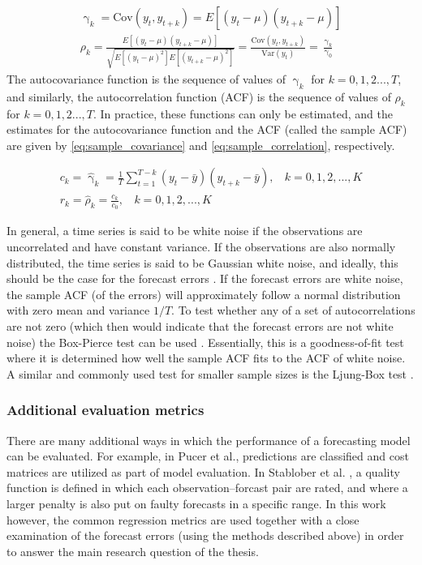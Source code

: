 \begin{gather}
     \upgamma_k = \text{Cov}(y_t, y_{t+k}) = E[(y_t - \mu)(y_{t+k} - \mu)] \label{eq:covariance} \\[1ex]
     \rho_k = \frac{E[(y_t - \mu)(y_{t+k} - \mu)]}{\sqrt{E[(y_t - \mu)^2]E[(y_{t+k} - \mu)^2]}} = \frac{\text{Cov}(y_t, y_{t+k})}{\text{Var}(y_t)} = \frac{\upgamma_k}{\upgamma_0}\label{eq:correlation}
\end{gather}
The autocovariance function is the sequence of values of $\upgamma_k$ for $k=0,1,2 ..., T$, and similarly, the autocorrelation function (ACF) is the sequence of values of $\rho_k$ for $k=0,1,2 ..., T$. In practice, these functions can only be estimated, and the estimates for the autocovariance function and the ACF (called the sample ACF) are given by \cref{eq:sample_covariance} and \cref{eq:sample_correlation}, respectively.

\begin{gather}
     c_k=\hat{\upgamma}_k = \frac{1}{T} \sum_{t=1}^{T-k} (y_t - \bar{y})(y_{t+k} - \bar{y}), \:\:\:\: k = 0,1,2,...,K \label{eq:sample_covariance} \\[1ex]
     r_k = \hat{\rho}_k = \frac{c_k}{c_0}, \:\:\:\: k = 0,1,2,...,K \label{eq:sample_correlation}
\end{gather}

In general, a time series is said to be white noise if the observations are uncorrelated and have constant variance. If the observations are also normally distributed, the time series is said to be Gaussian white noise, and ideally, this should be the case for the forecast errors \cite{Montgomery2015}. If the forecast errors are white noise, the sample ACF (of the errors) will approximately follow a normal distribution with zero mean and variance $1/T$. To test whether any of a set of autocorrelations are not zero (which then would indicate that the forecast errors are not white noise) the Box-Pierce test can be used \cite{Montgomery2015}. Essentially, this is a goodness-of-fit test where it is determined how well the sample ACF fits to the ACF of white noise. A similar and commonly used test for smaller sample sizes is the Ljung-Box test \cite{Montgomery2015}.

\subsubsection{Additional evaluation metrics}
There are many additional ways in which the performance of a forecasting model can be evaluated. For example, in Pucer et al.\cite{FaganeliPucer2018}, predictions are classified and cost matrices are utilized as part of model evaluation. In Stablober et al. \cite{Stadlober2008}, a quality function is defined in which each observation--forcast pair are rated, and where a larger penalty is also put on faulty forecasts in a specific range. In this work however, the common regression metrics are used together with a close examination of the forecast errors (using the methods described above) in order to answer the main research question of the thesis.  

